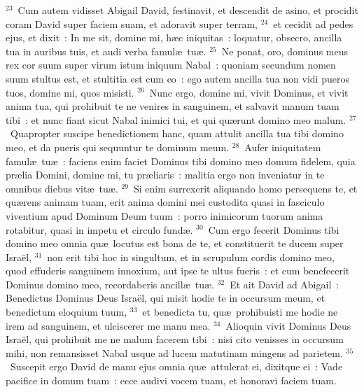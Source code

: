 ${}^{23}$~Cum autem vidisset Abigail David, festinavit, et descendit de asino, et procidit coram David super faciem suam, et adoravit super terram,
${}^{24}$~et cecidit ad pedes ejus, et dixit~: In me sit, domine mi, h\ae c iniquitas~: loquatur, obsecro, ancilla tua in auribus tuis, et audi verba famul\ae\ tu\ae .
${}^{25}$~Ne ponat, oro, dominus meus rex cor suum super virum istum iniquum Nabal~: quoniam secundum nomen suum stultus est, et stultitia est cum eo~: ego autem ancilla tua non vidi pueros tuos, domine mi, quos misisti.
${}^{26}$~Nunc ergo, domine mi, vivit Dominus, et vivit anima tua, qui prohibuit te ne venires in sanguinem, et salvavit manum tuam tibi~: et nunc fiant sicut Nabal inimici tui, et qui qu\ae runt domino meo malum.
${}^{27}$~Quapropter suscipe benedictionem hanc, quam attulit ancilla tua tibi domino meo, et da pueris qui sequuntur te dominum meum.
${}^{28}$~Aufer iniquitatem famul\ae\ tu\ae~: faciens enim faciet Dominus tibi domino meo domum fidelem, quia pr\ae lia Domini, domine mi, tu pr\ae liaris~: malitia ergo non inveniatur in te omnibus diebus vit\ae\ tu\ae .
${}^{29}$~Si enim surrexerit aliquando homo persequens te, et qu\ae rens animam tuam, erit anima domini mei custodita quasi in fasciculo viventium apud Dominum Deum tuum~: porro inimicorum tuorum anima rotabitur, quasi in impetu et circulo fund\ae .
${}^{30}$~Cum ergo fecerit Dominus tibi domino meo omnia qu\ae\ locutus est bona de te, et constituerit te ducem super Isra\"el,
${}^{31}$~non erit tibi hoc in singultum, et in scrupulum cordis domino meo, quod effuderis sanguinem innoxium, aut ipse te ultus fueris~: et cum benefecerit Dominus domino meo, recordaberis ancill\ae\ tu\ae .
${}^{32}$~Et ait David ad Abigail~: Benedictus Dominus Deus Isra\"el, qui misit hodie te in occursum meum, et benedictum eloquium tuum,
${}^{33}$~et benedicta tu, qu\ae\ prohibuisti me hodie ne irem ad sanguinem, et ulciscerer me manu mea.
${}^{34}$~Alioquin vivit Dominus Deus Isra\"el, qui prohibuit me ne malum facerem tibi~: nisi cito venisses in occursum mihi, non remansisset Nabal usque ad lucem matutinam mingens ad parietem.
${}^{35}$~Suscepit ergo David de manu ejus omnia qu\ae\ attulerat ei, dixitque ei~: Vade pacifice in domum tuam~: ecce audivi vocem tuam, et honoravi faciem tuam.


